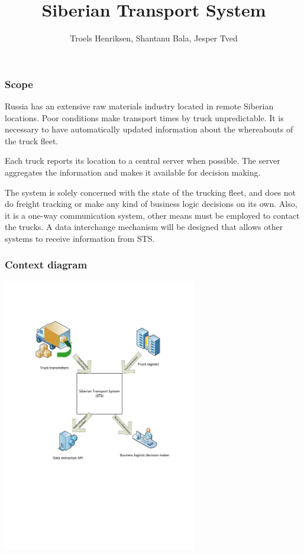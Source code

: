 \documentclass[12pt, danish]{beamer}
\title{Siberian Transport System}
\author{Troels Henriksen, Shantanu Bala, Jesper Tved}
\begin{document}
\begin{frame}
\titlepage
\end{frame}

\begin{frame}
\frametitle{Scope}

Russia has an extensive raw materials industry located in remote
Siberian locations.  Poor conditions make transport times by truck
unpredictable.  It is necessary to have automatically updated
information about the whereabouts of the truck fleet.

\pause

Each truck reports its location to a central server when possible.
The server aggregates the information and makes it available for
decision making.

\pause

The system is solely concerned with the state of the trucking fleet,
and does not do freight tracking or make any kind of business logic
decisions on its own.  Also, it is a one-way communication system,
other means must be employed to contact the trucks.  A data
interchange mechanism will be designed that allows other systems to
receive information from STS.

\end{frame}

\begin{frame}
\begin{center}
\frametitle{Context diagram}
  \includegraphics[height=12cm]{sts_context_view}\\
\end{center}
\end{frame}
\end{document}
